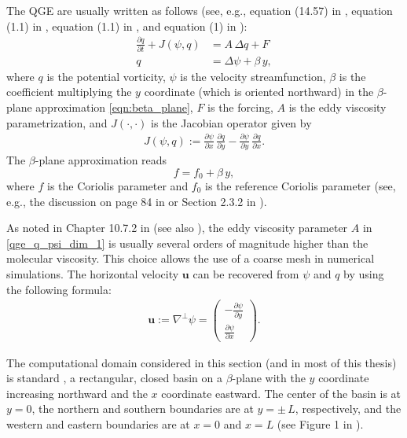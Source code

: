 The QGE are usually written as follows (see, e.g., equation (14.57) in
\cite{Vallis06}, equation (1.1) in \cite{Majda}, equation (1.1) in
\cite{Wang94}, and equation (1) in \cite{Greatbatch00}):
\begin{align}
  \frac{\partial q}{\partial t} + J(\psi , q) &= A \, \Delta q + F
    \label{qge_q_psi_dim_1} \\
  q &= \Delta \psi + \beta \, y , \label{qge_q_psi_dim_2}
\end{align}
where $q$ is the potential vorticity, $\psi$ is the velocity streamfunction,
$\beta$ is the coefficient multiplying the $y$ coordinate (which is oriented
northward) in the $\beta$-plane approximation \eqref{eqn:beta_plane}, $F$ is the
forcing, $A$ is the eddy viscosity parametrization, and $J(\cdot , \cdot)$ is
the Jacobian operator given by
\begin{align}
  J(\psi , q) := \frac{\partial \psi}{\partial x} \, \frac{\partial q}{\partial y} -
    \frac{\partial \psi}{\partial y} \, \frac{\partial q}{\partial x} . \label{eqn:jacobian}
\end{align}
The $\beta$-plane approximation reads
\begin{equation}
  f = f_0 + \beta \, y , \label{eqn:beta_plane}
\end{equation}
where $f$ is the Coriolis parameter and $f_0$ is the reference Coriolis
parameter (see, e.g., the discussion on page 84 in \cite{Cushman94} or Section
2.3.2 in \cite{Vallis06}).

As noted in Chapter 10.7.2 in \cite{Vallis06} (see also \cite{San12}), the eddy
viscosity parameter $A$ in \eqref{qge_q_psi_dim_1} is usually several orders of
magnitude higher than the molecular viscosity. This choice allows the use of a
coarse mesh in numerical simulations. The horizontal velocity $\mathbf{u}$ can
be recovered from $\psi$ and $q$ by using the following formula:
\begin{align}
  \mathbf{u} := \nabla^{\perp} \psi =
    \begin{pmatrix} - \frac{\partial \psi}{\partial y} \\
    \frac{\partial \psi}{\partial x}
  \end{pmatrix} .
\label{eqn:u_psi}
\end{align}

The computational domain considered in this section (and in most of this thesis)
is standard \cite{Greatbatch00}, a rectangular, closed basin on a $\beta$-plane
with the $y$ coordinate increasing northward and the $x$ coordinate eastward.
The center of the basin is at $y=0$, the northern and southern boundaries are at
$y = \pm \, L$, respectively, and the western and eastern boundaries are at $x =
0$ and $x = L$ (see Figure 1 in \cite{Greatbatch00}).

